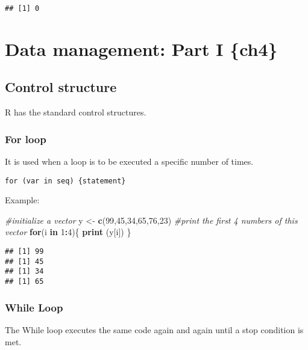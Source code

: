 \documentclass[]{book}
\newenvironment{Shaded}{\begin{snugshade}}{\end{snugshade}}
\newcommand{\KeywordTok}[1]{\textcolor[rgb]{0.13,0.29,0.53}{\textbf{#1}}}
\newcommand{\DecValTok}[1]{\textcolor[rgb]{0.00,0.00,0.81}{#1}}
\newcommand{\StringTok}[1]{\textcolor[rgb]{0.31,0.60,0.02}{#1}}
\newcommand{\CommentTok}[1]{\textcolor[rgb]{0.56,0.35,0.01}{\textit{#1}}}
\newcommand{\ControlFlowTok}[1]{\textcolor[rgb]{0.13,0.29,0.53}{\textbf{#1}}}
\newcommand{\OperatorTok}[1]{\textcolor[rgb]{0.81,0.36,0.00}{\textbf{#1}}}
\newcommand{\NormalTok}[1]{#1}
\theoremstyle{definition}
\theoremstyle{definition}
\theoremstyle{definition}
\theoremstyle{remark}
\begin{document}
\begin{verbatim}
## [1] 0
\end{verbatim}

\chapter{Data management: Part I
\{ch4\}}\label{data-management-part-i-ch4}

\section{Control structure}\label{control-structure}

R has the standard control structures.

\subsection{For loop}\label{for-loop}

It is used when a loop is to be executed a specific number of times.

\begin{verbatim}
for (var in seq) {statement}
\end{verbatim}

Example:

\begin{Shaded}
\begin{Highlighting}[]
\CommentTok{#initialize a vector}
\NormalTok{y <-}\StringTok{ }\KeywordTok{c}\NormalTok{(}\DecValTok{99}\NormalTok{,}\DecValTok{45}\NormalTok{,}\DecValTok{34}\NormalTok{,}\DecValTok{65}\NormalTok{,}\DecValTok{76}\NormalTok{,}\DecValTok{23}\NormalTok{)}
\CommentTok{#print the first 4 numbers of this vector}
\ControlFlowTok{for}\NormalTok{(i }\ControlFlowTok{in} \DecValTok{1}\OperatorTok{:}\DecValTok{4}\NormalTok{)\{}
     \KeywordTok{print}\NormalTok{ (y[i])}
\NormalTok{\}}
\end{Highlighting}
\end{Shaded}

\begin{verbatim}
## [1] 99
## [1] 45
## [1] 34
## [1] 65
\end{verbatim}

\subsection{While Loop}\label{while-loop}

The While loop executes the same code again and again until a stop
condition is met.
\end{document}
